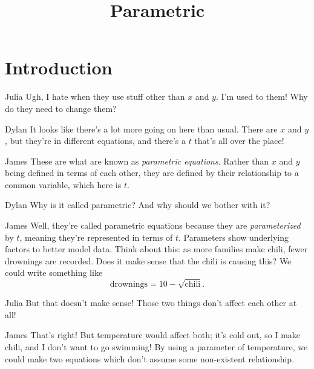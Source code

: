 \documentclass{ximera}
\title{Parametric}
\begin{document}
\maketitle
\section{Introduction}
\begin{dialogue}
\item[Julia] Ugh, I hate when they use stuff other than $x$ and $y$. I'm used to them! Why do they need to change them?
\item[Dylan] It looks like there's a lot more going on here than usual. There are $x$ and $y$, but they're in different equations, and there's a $t$ that's all over the place!
\item[James] These are what are known as \textit{parametric equations}. Rather than $x$ and $y$ being defined in terms of each other, they are defined by their relationship to a common variable, which here is $t$.
\item[Dylan] Why is it called parametric? And why should we bother with it?
\item[James] Well, they're called parametric equations because they are \textit{parameterized} by $t$, meaning they're represented in terms of $t$. Parameters show underlying factors to better model data. Think about this: as more families make chili, fewer drownings are recorded. Does it make sense that the chili is causing this? We could write something like $$\text{drownings} = 10 - \sqrt{\text{chili}}\text{.}$$
\item[Julia] But that doesn't make sense! Those two things don't affect each other at all!
\item[James] That's right! But temperature would affect both; it's cold out, so I make chili, and I don't want to go swimming! By using a parameter of temperature, we could make two equations which don't assume some non-existent relationship.
\end{dialogue}
\end{document}
